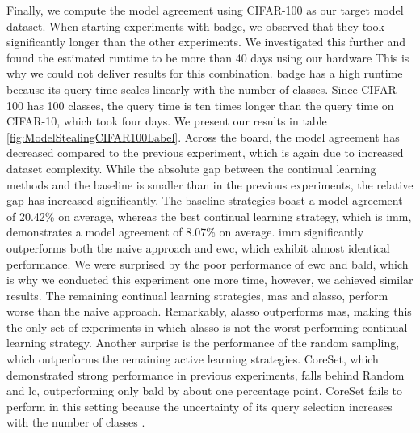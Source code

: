 Finally, we compute the model agreement using CIFAR-100 as our target model dataset. When starting experiments with \gls{badge}, we observed that they
took significantly longer than the other experiments. We investigated this further and found the estimated runtime to be more than 40 days using our hardware
This is why we could not deliver results for this combination.  \gls{badge} has a high runtime because its query time scales linearly with the number of classes. Since
CIFAR-100 has 100 classes, the query time is ten times longer than the query time on CIFAR-10, which took four days. We present our results in table 
\ref{fig:ModelStealingCIFAR100Label}. Across the board, the model agreement has decreased compared to the previous experiment, which is again due to increased dataset
complexity. While the absolute gap between the continual learning methods and the baseline is smaller than in the previous experiments, the relative gap has increased
significantly. The baseline strategies boast a model agreement of 20.42\% on average, whereas the best continual learning strategy, which is \gls{imm}, demonstrates a
model agreement of 8.07\% on average. \gls{imm} significantly outperforms both the naive approach and \gls{ewc}, which exhibit almost identical performance. We were surprised
by the poor performance of \gls{ewc} and \gls{bald}, which is why we conducted this experiment one more time, however, we achieved similar results. The remaining
continual learning strategies, \gls{mas} and \gls{alasso}, perform worse than the naive approach. Remarkably, \gls{alasso} outperforms \gls{mas}, making this the
only set of experiments in which \gls{alasso} is not the worst-performing continual learning strategy. Another surprise is the performance of the random sampling,
which outperforms the remaining active learning strategies. CoreSet, which demonstrated strong performance in previous experiments, falls behind
Random and \gls{lc}, outperforming only \gls{bald} by about one percentage point. CoreSet fails to perform in this setting because the uncertainty of its query
selection increases with the number of classes \cite{sener2017active}. \par


